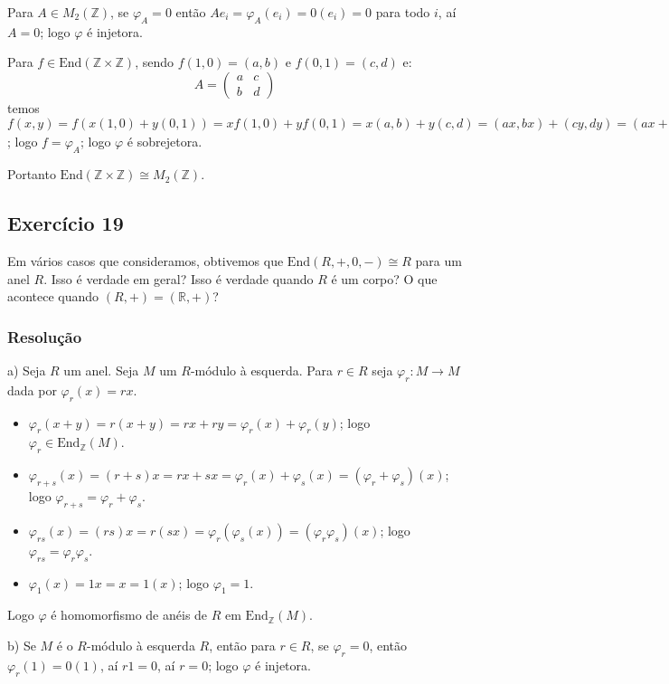 \documentclass[10pt,a4paper]{article}
\begin{document}
\medskip
\noindent
Para $A\in M_2(\mathbb{Z})$, se $\varphi_A=0$ então $Ae_i=\varphi_A(e_i)=0(e_i)=0$ para todo $i$, aí $A=0$; logo $\varphi$ é injetora.

\medskip
\noindent
Para $f\in\mathrm{End}(\mathbb{Z}\times\mathbb{Z})$, sendo $f(1,0)=(a,b)$ e $f(0,1)=(c,d)$ e:
\[
A=\begin{pmatrix}
a&c\\b&d
\end{pmatrix}
\]
temos $f(x,y)=f(x(1,0)+y(0,1))=xf(1,0)+yf(0,1)=x(a,b)+y(c,d)=(ax,bx)+(cy,dy)=(ax+cy,bx+dy)=A(x,y)=\varphi_A(x,y)$; logo $f=\varphi_A$; logo $\varphi$ é sobrejetora.

\medskip
\noindent
Portanto $\mathrm{End}(\mathbb{Z}\times\mathbb{Z})\cong M_2(\mathbb{Z})$.

\subsection*{Exercício 19}

Em vários casos que consideramos, obtivemos que $\mathrm{End}(R,+,0,-)\cong R$ para um anel $R$. Isso é verdade em geral? Isso é verdade quando $R$ é um corpo? O que acontece quando $(R,+)=(\mathbb{R},+)$?

\subsubsection*{Resolução}

a) Seja $R$ um anel. Seja $M$ um $R$-módulo à esquerda. Para $r\in R$ seja $\varphi_r:M\rightarrow M$ dada por $\varphi_r(x)=rx$.
\begin{itemize}
\item $\varphi_r(x+y)=r(x+y)=rx+ry=\varphi_r(x)+\varphi_r(y)$; logo $\varphi_r\in\mathrm{End}_\mathbb{Z}(M)$.
\item $\varphi_{r+s}(x)=(r+s)x=rx+sx=\varphi_r(x)+\varphi_s(x)=(\varphi_r+\varphi_s)(x)$; logo $\varphi_{r+s}=\varphi_r+\varphi_s$.
\item $\varphi_{rs}(x)=(rs)x=r(sx)=\varphi_r(\varphi_s(x))=(\varphi_r\varphi_s)(x)$; logo $\varphi_{rs}=\varphi_r\varphi_s$.
\item $\varphi_1(x)=1x=x=1(x)$; logo $\varphi_1=1$.
\end{itemize}
Logo $\varphi$ é homomorfismo de anéis de $R$ em $\mathrm{End}_\mathbb{Z}(M)$.

\medskip
\noindent
b) Se $M$ é o $R$-módulo à esquerda $R$, então para $r\in R$, se $\varphi_r=0$, então $\varphi_r(1)=0(1)$, aí $r1=0$, aí $r=0$; logo $\varphi$ é injetora.
\end{document}
